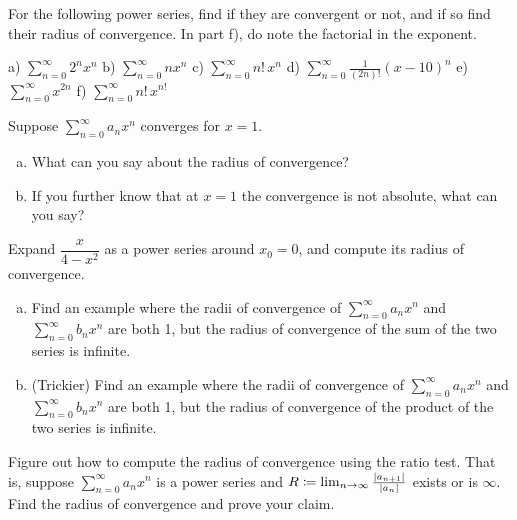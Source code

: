 \begin{exercise}
For the following power series, find if they are convergent or not, and
if so find their radius of convergence.
In part f), do note the factorial in the exponent.

\medskip

\noindent
a)
$\displaystyle \sum_{n=0}^\infty 2^n x^n$
\qquad
b) $\displaystyle \sum_{n=0}^\infty n x^n$
\qquad 
c) 
$\displaystyle \sum_{n=0}^\infty n! \, x^n$
\qquad
d) $\displaystyle \sum_{n=0}^\infty \frac{1}{(2n)!} {(x-10)}^n$
\qquad
e) $\displaystyle \sum_{n=0}^\infty x^{2n}$
\qquad
f) $\displaystyle \sum_{n=0}^\infty n! \, x^{n!}$
\end{exercise}

\begin{exercise}
Suppose $\sum_{n=0}^\infty a_n x^n$ converges for $x=1$.
\begin{enumerate}[a)]
\item
What can you say about the radius of convergence?
\item
If you further know that at $x=1$ the convergence is not absolute,
what can you say?
\end{enumerate}
\end{exercise}

\begin{exercise}
Expand
$\dfrac{x}{4-x^2}$ as a power series around $x_0 = 0$,
and compute its radius of convergence.
\end{exercise}

\begin{exercise}
\leavevmode
\begin{enumerate}[a)]
\item
Find an example where the radii of convergence of $\sum_{n=0}^\infty a_n x^n$ and
$\sum_{n=0}^\infty b_n x^n$ are both 1, but the radius of convergence of
the sum of the two series is infinite.
\item
(Trickier)
Find an example where the radii of convergence of $\sum_{n=0}^\infty a_n x^n$ and
$\sum_{n=0}^\infty b_n x^n$ are both 1, but the radius of convergence of
the product of the two series is infinite.
\end{enumerate}
\end{exercise}

\begin{exercise}
Figure out how to compute the radius of convergence using the ratio test.
That is, suppose $\sum_{n=0}^\infty a_n x^n$ is a power series and
$R \coloneqq \lim_{n\to\infty} \frac{\lvert {a_{n+1}} \rvert}{\lvert {a_n} \rvert}$ exists or is $\infty$.
Find the radius of convergence and prove your claim.
\end{exercise}

